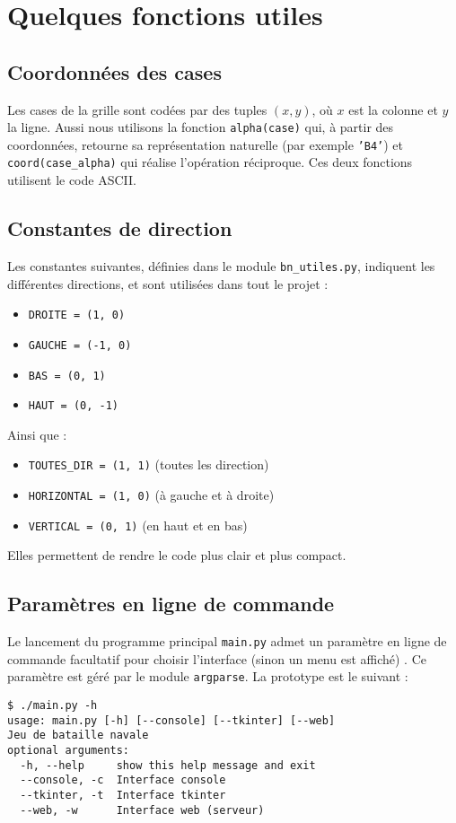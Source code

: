 \chapter{Quelques fonctions utiles}

\section{Coordonnées des cases}
Les cases de la grille sont codées par des tuples $(x,y)$, où $x$ est la colonne et $y$ la ligne. Aussi nous utilisons la fonction \texttt{alpha(case)} qui, à partir des coordonnées, retourne sa représentation naturelle (par exemple \texttt{'B4'}) et \texttt{coord(case\_alpha)} qui réalise l'opération réciproque. Ces deux fonctions utilisent le code ASCII.

\section{Constantes de direction}
Les constantes suivantes, définies dans le module \texttt{bn\_utiles.py}, indiquent les différentes directions, et sont utilisées dans tout le projet :
\begin{itemize}
\item \texttt{DROITE = (1, 0)} 
\item \texttt{GAUCHE = (-1, 0)}
\item \texttt{BAS = (0, 1)}
\item \texttt{HAUT = (0, -1)}
\end{itemize}
Ainsi que :
\begin{itemize}
\item \texttt{TOUTES\_DIR = (1, 1)} (toutes les direction)
\item \texttt{HORIZONTAL = (1, 0)} (à gauche et à droite)
\item \texttt{VERTICAL = (0, 1)} (en haut et en bas)
\end{itemize}
Elles permettent de rendre le code plus clair et plus compact.

\section{Paramètres en ligne de commande}
Le lancement du programme principal \texttt{main.py} admet un paramètre en ligne de commande facultatif pour choisir l'interface (sinon un menu est affiché) . Ce paramètre est géré par le module \texttt{argparse}. La prototype est le suivant :

%
%

\begin{verbatim}
$ ./main.py -h
usage: main.py [-h] [--console] [--tkinter] [--web]
Jeu de bataille navale
optional arguments:
  -h, --help     show this help message and exit
  --console, -c  Interface console
  --tkinter, -t  Interface tkinter
  --web, -w      Interface web (serveur)
\end{verbatim}